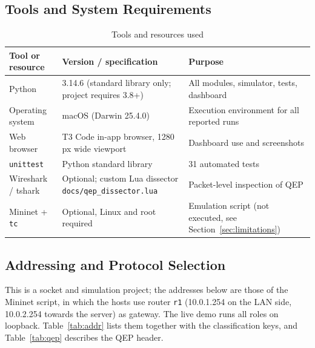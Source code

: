\documentclass[12pt,a4paper]{article}
\newcommand{\code}[1]{\texttt{#1}}
\begin{document}
\subsection{Tools and System Requirements}
\begin{table}[H]\centering\small
\caption{Tools and resources used}\label{tab:tools}
\begin{tabularx}{\textwidth}{|l|l|X|}\hline
\textbf{Tool or resource} & \textbf{Version / specification} & \textbf{Purpose}\\\hline
Python & 3.14.6 (standard library only; project requires 3.8+) & All modules, simulator, tests, dashboard\\\hline
Operating system & macOS (Darwin 25.4.0) & Execution environment for all reported runs\\\hline
Web browser & T3 Code in-app browser, 1280 px wide viewport & Dashboard use and screenshots\\\hline
\code{unittest} & Python standard library & 31 automated tests\\\hline
Wireshark / tshark & Optional; custom Lua dissector \code{docs/qep\_dissector.lua} & Packet-level inspection of QEP\\\hline
Mininet + \code{tc} & Optional, Linux and root required & Emulation script (not executed, see Section~\ref{sec:limitations})\\\hline
\end{tabularx}
\end{table}

\subsection{Addressing and Protocol Selection}
This is a socket and simulation project; the addresses below are those of the Mininet script, in
which the hosts use router \code{r1} (10.0.1.254 on the LAN side, 10.0.2.254 towards the server) as
gateway. The live demo runs all roles on loopback. Table~\ref{tab:addr}
lists them together with the classification keys, and Table~\ref{tab:qep} describes the QEP header.
\end{document}
